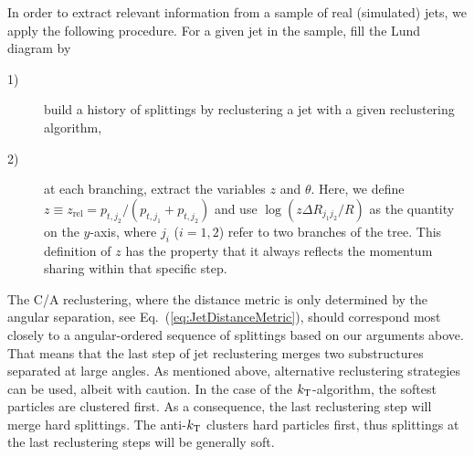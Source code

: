 In order to extract relevant information from a sample of real (simulated) jets, we apply the following procedure.
For a given jet in the sample, fill the Lund diagram by
\begin{description}
\item[1)] build a history of splittings by reclustering a jet with a given reclustering algorithm,
\item[2)] at each branching, extract the variables $z$ and $\theta$. Here, we define $z \equiv z_\text{rel} = p_{t,j_2}/(p_{t,j_1}+p_{t,j_2})$ and use $\log(z \Delta R_{j_1 j_2}/R)$ as the quantity on the $y$-axis, where $j_i$ ($i=1,2$) refer to two branches of the tree.
This definition of $z$ has the property that it always reflects the momentum sharing within that  specific step.

\end{description}
The C/A reclustering, where the distance metric is only determined by the angular separation, see Eq.~(\ref{eq:JetDistanceMetric}), should correspond most closely to a angular-ordered sequence of splittings based on our arguments above. That means that the last step of jet reclustering merges two substructures separated at large angles.
As mentioned above, alternative reclustering strategies can be used, albeit with caution.
In the case of the $k_{\rm \tiny T}$-algorithm, the softest particles are clustered first. As a consequence, the last reclustering step will merge hard splittings. The anti-$k_{\rm \tiny T}$ clusters hard particles first, thus splittings at the last reclustering steps will be generally soft. 

